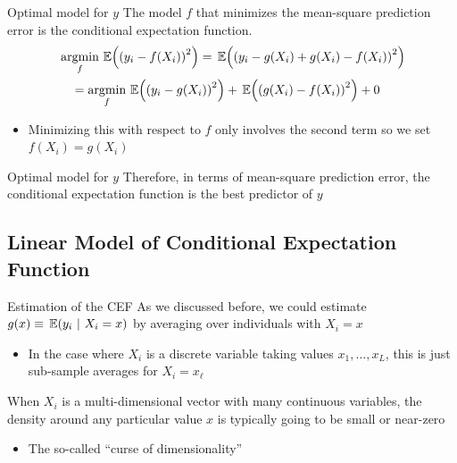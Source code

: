 \documentclass[aspectratio=169,t,11pt,table]{beamer}
\begin{document}
\begin{frame}{Optimal model for $y$}
  The model $f$ that minimizes the mean-square prediction error is the conditional expectation function.
  \begin{align*}
    &\argmin_{f} \expec{\left( y_i - f(X_i) \right)^2} = \expec{\left( y_i - g(X_i) + g(X_i) - f(X_i) \right)^2} \\
    &\quad= \argmin_{f} \expec{\left( y_i - g(X_i) \right)^2} + \expec{\left( g(X_i) - f(X_i) \right)^2} + 0
  \end{align*}

  \begin{itemize}
    \item Minimizing this with respect to $f$ only involves the second term so we set $f(X_i) = g(X_i)$
  \end{itemize}
\end{frame}

\begin{frame}{Optimal model for $y$}
  Therefore, in terms of mean-square prediction error, the conditional expectation function is the best predictor of $y$
\end{frame}

\subsection{Linear Model of Conditional Expectation Function}

\begin{frame}{Estimation of the CEF}
  As we discussed before, we could estimate $g(x) \equiv \expec{y_i}{X_i = x}$ by averaging over individuals with $X_i = x$
  \begin{itemize}
    \item In the case where $X_i$ is a discrete variable taking values $x_1, \dots, x_L$, this is just sub-sample averages for $X_i = x_\ell$
  \end{itemize}

  \pause
  \bigskip
  When $X_i$ is a multi-dimensional vector with many continuous variables, the density around any particular value $x$ is typically going to be small or near-zero 
  \begin{itemize}
    \item The so-called ``curse of dimensionality''
  \end{itemize}
\end{frame}
\end{document}
